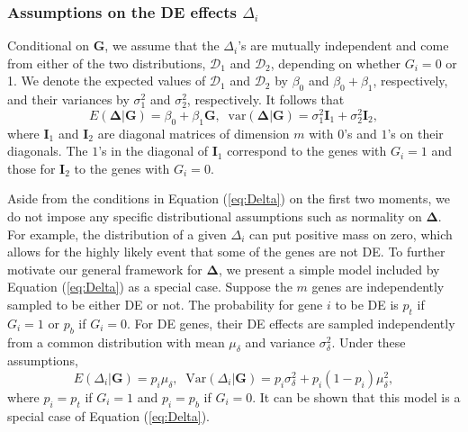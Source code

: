 \documentclass[a4,center,fleqn]{NAR}
\begin{document}
	\subsubsection{Assumptions on the DE effects $\Delta_i$}\label{subsection:DeltaModel}
	Conditional on $\bm G$, we assume that the $\Delta_i$'s are mutually independent and come from
	either of the two distributions, $\mathscr{D}_1$ and $\mathscr{D}_2$, depending on whether $G_i=0$
	or 1. We denote the expected values of $\mathscr{D}_1$ and $\mathscr{D}_2$ by $\beta_0$ and
	$\beta_0+\beta_1$, respectively, and their variances by $\sigma_1^2$ and $\sigma_2^2$, respectively.
	It follows that 
	\begin{equation}
	\label{eq:Delta}
	E(\bm \Delta|\bm G)=\beta_0 + \beta_1 \bm G,\;\; \mbox{var}(\bm \Delta|\bm G) = \sigma_1^2\bm
	I_1+\sigma_2^2\bm I_2,
	\end{equation} 
	where $\bm I_1$ and $\bm I_2$ are diagonal matrices of dimension $m$ with $0$'s and $1$'s on their
	diagonals. The $1$'s in the diagonal of $\bm I_1$ correspond to the genes with $G_i=1$ and those for
	$\bm I_2$ to the genes with $G_i=0$.
	
	Aside from the conditions in Equation (\ref{eq:Delta}) on the first two moments, we do not impose
	any specific distributional assumptions such as normality on $\bm \Delta$. For example, the
	distribution of a given $\Delta_i$ can put positive mass on zero, which allows for the highly likely
	event that some of the genes are not DE. To further motivate our general framework for $\bm \Delta$,
	we present a simple model included by Equation (\ref{eq:Delta}) as a special case. Suppose the $m$
	genes are independently sampled to be either DE or not. The probability for gene $i$ to be DE is
	$p_t$ if $G_i=1$ or $p_b$ if $G_i=0$. For DE genes, their DE effects are sampled independently from
	a common distribution with mean $\mu_\delta$ and variance $\sigma^2_\delta$. Under these
	assumptions, 
	\begin{equation}
	\label{eq:DeltaBinom}
	E(\Delta_i|\bm G) = p_i\mu_{\delta},\;\; \text{Var}(\Delta_i|\bm G)= p_i\sigma_{\delta}^2 +
	p_i(1-p_i)\mu_{\delta}^2,
	\end{equation}
	where $p_i=p_{t}$ if $G_i=1$ and $p_i=p_{b}$ if $G_i=0$. It can be shown that this model is a
	special case of Equation (\ref{eq:Delta}).
	
\end{document}
